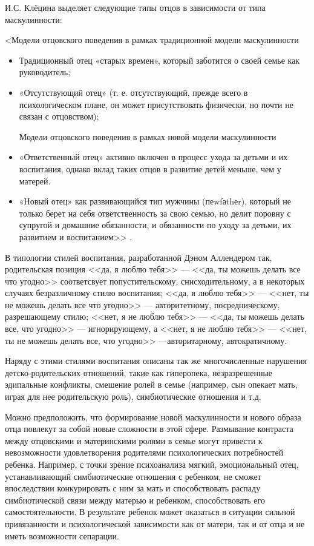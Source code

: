 \documentclass{../../common/thesisbyxetex}
\begin{document}
И.С. Клёцина выделяет следующие типы отцов в зависимости от типа маскулинности:

<Модели отцовского поведения в рамках традиционной модели маскулинности

\begin{itemize}
	\item Традиционный отец «старых времен», который заботится о своей семье как руководитель;
	\item «Отсутствующий отец» (т. е. отсутствующий, прежде всего в психологическом плане, он может
присутствовать физически, но почти не связан с отцовством);

Модели отцовского поведения в рамках новой модели маскулинности
	\item «Ответственный отец» активно включен в процесс ухода за детьми и их воспитания, однако
вклад таких
отцов в развитие детей меньше, чем у матерей.
	\item «Новый отец» как развивающийся тип мужчины (пеwfаthеr), который не только берет на себя
ответственность за свою семью, но делит поровну с супругой и домашние обязанности, и обязанности по
уходу за детьми, их развитием и воспитанием>> \cite{clec}.

\end{itemize}


В типологии стилей воспитания, разработанной Дэном Аллендером так, родительская позиция <<да, я
люблю тебя>> --- <<да, ты можешь делать
все что угодно>> соответсвует попустительскому, снисходительному, а в некоторых случаях
безразличному стилю воспитания; <<да, я люблю тебя>>  --- <<нет, ты не можешь делать все что
угодно>> --- авторитетному, посредническому, разрешающему стилю; <<нет, я не люблю тебя>> --- <<да,
ты можешь делать все, что угодно>>  --- игнорирующему, а  <<нет, я не люблю тебя>> --- <<нет, ты не
можешь делать все, что угодно>> ---авторитарному, автократичному.


Наряду с этими стилями воспитания описаны так же многочисленные нарушения детско-родительских
отношений, такие как гиперопека,  незразрешенные эдипальные конфликты, смешение ролей в семье
(например, сын опекает мать, играя для нее родительскую роль), симбиотические отношения
и т.д.

Можно предположить, что формирование новой маскулинности и нового образа отца повлекут за собой
новые сложности в этой сфере. Размывание контраста между отцовскими и материнскими ролями в семье
могут привести к невозможности удовлетворения родителями психологических потребностей ребенка.
Например, с точки зрение психоанализа 	мягкий, эмоциональный отец, устанавливающий симбиотические
отношения с ребенком, не сможет впоследствии конкурировать с ним за мать и способствовать распаду
симбиотической связи между матерью и ребенком, способствовать его самостоятельности. В результате
ребенок может оказаться в ситуации сильной привязанности и психологической зависимости как от
матери, так и от отца и не иметь возможности сепарации.
\end{document}
